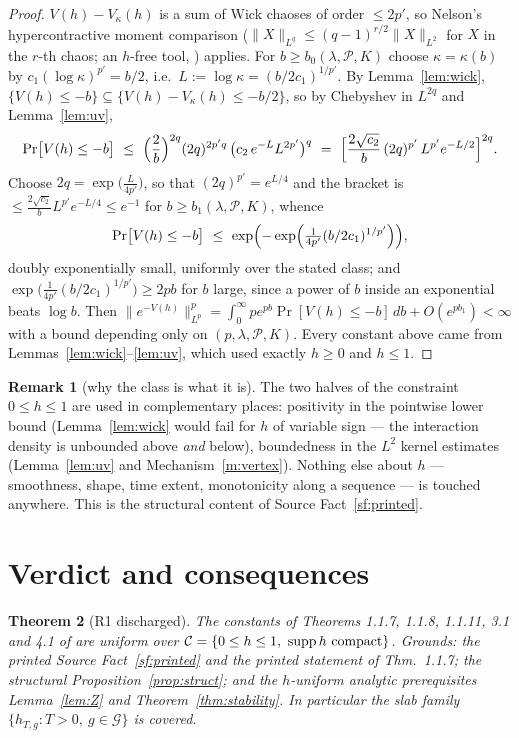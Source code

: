 \documentclass[11pt,a4paper]{article}
\theoremstyle{plain}
\newtheorem{theorem}{Theorem}[section]
\theoremstyle{definition}
\newtheorem{remark}[theorem]{Remark}
\DeclareMathOperator{\supp}{supp}
\begin{document}
\begin{proof}
$V(h)-V_\kappa(h)$ is a sum of Wick chaoses of order $\le2p'$, so Nelson's hypercontractive
moment comparison ($\|X\|_{L^q}\le(q-1)^{r/2}\|X\|_{L^2}$ for $X$ in the $r$-th chaos; an
$h$-free tool, \cite[\S I.5, Thm.~V.9]{SimonBook}) applies. For $b\ge b_0(\lambda,\mathscr P,K)$
choose $\kappa=\kappa(b)$ by $c_1(\log\kappa)^{p'}=b/2$, i.e.\
$L:=\log\kappa=(b/2c_1)^{1/p'}$. By Lemma~\ref{lem:wick}, $\{V(h)\le-b\}\subseteq
\{V(h)-V_\kappa(h)\le-b/2\}$, so by Chebyshev in $L^{2q}$ and Lemma~\ref{lem:uv},
\[
  \Pr\bigl[V(h)\le-b\bigr]
  \ \le\ \Bigl(\frac2b\Bigr)^{2q}(2q)^{2p'q}\,
  \bigl(c_2\,e^{-L}L^{2p'}\bigr)^{q}
  \ =\ \Bigl[\frac{2\sqrt{c_2}}{b}\,(2q)^{p'}\,L^{p'}e^{-L/2}\Bigr]^{2q}.
\]
Choose $2q=\exp\bigl(\frac{L}{4p'}\bigr)$, so that $(2q)^{p'}=e^{L/4}$ and the bracket is
$\le\frac{2\sqrt{c_2}}{b}L^{p'}e^{-L/4}\le e^{-1}$ for $b\ge b_1(\lambda,\mathscr P,K)$, whence
\[
  \Pr\bigl[V(h)\le-b\bigr]\ \le\ \exp\Bigl(-\exp\Bigl(\tfrac1{4p'}(b/2c_1)^{1/p'}\Bigr)\Bigr),
\]
doubly exponentially small, uniformly over the stated class; and
$\exp\bigl(\frac1{4p'}(b/2c_1)^{1/p'}\bigr)\ge2pb$ for $b$ large, since a power of $b$ inside an
exponential beats $\log b$. Then
$\|e^{-V(h)}\|_{L^p}^p=\int_0^\infty pe^{pb}\Pr[V(h)\le-b]\,db+O(e^{pb_1})<\infty$ with a bound
depending only on $(p,\lambda,\mathscr P,K)$. Every constant above came from
Lemmas~\ref{lem:wick}--\ref{lem:uv}, which used exactly $h\ge0$ and $h\le1$.
\end{proof}

\begin{remark}[why the class is what it is]
The two halves of the constraint $0\le h\le1$ are used in complementary places: positivity in
the pointwise lower bound (Lemma~\ref{lem:wick} would fail for $h$ of variable sign --- the
interaction density is unbounded above \emph{and} below), boundedness in the $L^2$ kernel
estimates (Lemma~\ref{lem:uv} and Mechanism~\ref{m:vertex}). Nothing else about $h$ ---
smoothness, shape, time extent, monotonicity along a sequence --- is touched anywhere. This is
the structural content of Source Fact~\ref{sf:printed}.
\end{remark}

\section{Verdict and consequences}

\begin{theorem}[R1 discharged]\label{thm:verdict}
The constants of Theorems 1.1.7, 1.1.8, 1.1.11, 3.1 and 4.1 of \cite{GJS} are uniform over
$\mathcal C=\{0\le h\le1,\ \supp h\ \textup{compact}\}$. Grounds: the printed Source
Fact~\ref{sf:printed} and the printed statement of Thm.~1.1.7; the structural
Proposition~\ref{prop:struct}; and the $h$-uniform analytic prerequisites
Lemma~\ref{lem:Z} and Theorem~\ref{thm:stability}. In particular the slab family
$\{h_{T,g}:T>0,\ g\in\mathcal G\}$ is covered.
\end{theorem}
\end{document}
